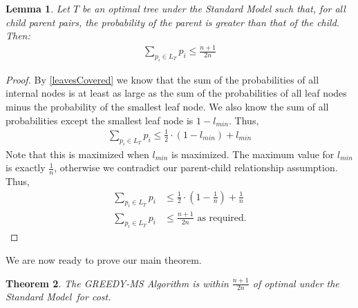 \documentclass[letterpaper,12pt,titlepage,oneside,final]{book}
\theoremstyle{plain}
\newtheorem{thm}{Theorem}[section]
\newtheorem{lem}[thm]{Lemma}
\begin{document}
\begin{lem}\label{leavesHalf}
Let $T$ be an optimal tree under the \textit{Standard Model} such that, for all child parent pairs, the probability of the parent is greater than that of the child. Then:
\begin{align*}
\sum_{p_i \in L_T} p_i \leq \frac{n+1}{2n}
\end{align*}
\end{lem}
\begin{proof}
By \ref{leavesCovered} we know that the sum of the probabilities of all internal nodes is at least as large as the sum of the probabilities of all leaf nodes minus the probability of the smallest leaf node. We also know the sum of all probabilities except the smallest leaf node is $1-l_{min}$. Thus, 
\begin{align*}
\sum_{p_i \in L_T} p_i \leq \frac{1}{2} \cdot (1-l_{min}) + l_{min}
\end{align*}
\noindent Note that this is maximized when $l_{min}$ is maximized. The maximum value for $l_{min}$ is exactly $\frac{1}{n}$, otherwise we contradict our parent-child relationship assumption. Thus,
\begin{align*}
\sum_{p_i \in L_T} p_i &\leq \frac{1}{2} \cdot (1-\frac{1}{n}) + \frac{1}{n} \\
\sum_{p_i \in L_T} p_i &\leq \frac{n+1}{2n} \text{ as required.}
\end{align*}
\end{proof}


We are now ready to prove our main theorem.

\begin{thm}
The \textit{GREEDY-MS} Algorithm is within $\frac{n+1}{2n}$ of optimal under the \textit{Standard Model}\ for cost.
\end{thm}
\end{document}
